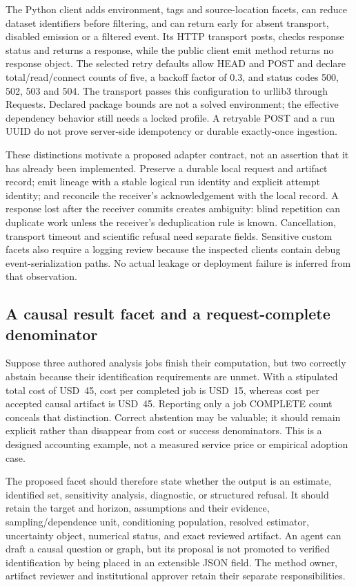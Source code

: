 The Python client adds environment, tags and source-location facets, can
reduce dataset identifiers before filtering, and can return early for absent
transport, disabled emission or a filtered event. Its HTTP transport posts,
checks response status and returns a response, while the public client emit
method returns no response object. The selected retry defaults allow HEAD
and POST and declare total/read/connect counts of five, a backoff factor of
0.3, and status codes 500, 502, 503 and 504. The transport passes this
configuration to urllib3 through Requests. Declared package bounds are not
a solved environment; the effective dependency behavior still needs a locked
profile. A retryable POST and a run UUID do not prove server-side idempotency
or durable exactly-once ingestion. \citep{exec24_openlineage_source}

These distinctions motivate a proposed adapter contract, not an assertion
that it has already been implemented. Preserve a durable local request and
artifact record; emit lineage with a stable logical run identity and explicit
attempt identity; and reconcile the receiver's acknowledgement with the
local record. A response lost after the receiver commits creates ambiguity:
blind repetition can duplicate work unless the receiver's deduplication rule
is known. Cancellation, transport timeout and scientific refusal need separate
fields. Sensitive custom facets also require a logging review because the
inspected clients contain debug event-serialization paths. No actual leakage
or deployment failure is inferred from that observation.
\citep{exec24_openlineage_source}

\subsection{A causal result facet and a request-complete denominator}
Suppose three authored analysis jobs finish their computation, but two
correctly abstain because their identification requirements are unmet. With
a stipulated total cost of USD~45, cost per completed job is USD~15,
whereas cost per accepted causal artifact is USD~45. Reporting only a job
COMPLETE count conceals that distinction. Correct abstention may be valuable;
it should remain explicit rather than disappear from cost or success
denominators. This is a designed accounting example, not a measured service
price or empirical adoption case. \citep{exec24_openlineage_reference}

The proposed facet should therefore state whether the output is an estimate,
identified set, sensitivity analysis, diagnostic, or structured refusal. It
should retain the target and horizon, assumptions and their evidence,
sampling/dependence unit, conditioning population, resolved estimator,
uncertainty object, numerical status, and exact reviewed artifact. An agent
can draft a causal question or graph, but its proposal is not promoted to
verified identification by being placed in an extensible JSON field.
The method owner, artifact reviewer and institutional approver retain their
separate responsibilities.


